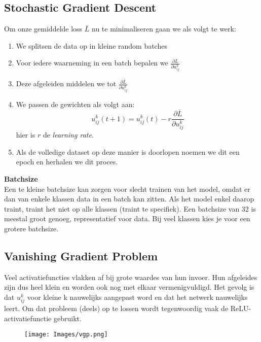 {\subsection{Stochastic Gradient Descent}
\noindent Om onze gemiddelde loss $\bar{L}$ nu te minimaliseren gaan we als volgt te werk:
\begin{enumerate}
    \item We splitsen de data op in kleine random batches
    \item Voor iedere waarneming in een batch bepalen we $\frac{\partial L}{\partial u_{ij}^k}$
    \item Deze afgeleiden middelen we tot $\frac{\partial \bar{L}}{\partial u_{ij}^k}$
    \item We passen de gewichten als volgt aan:
    \[u_{ij}^k(t+1)=u_{ij}^k(t)-r\frac{\partial \bar{L}}{\partial u_{ij}^k}\]
    hier is $r$ de \textit{learning rate}.
    \item Als de volledige dataset op deze manier is doorlopen noemen we dit een epoch en herhalen we dit proces.
\end{enumerate}

\textbf{Batchsize}\\
Een te kleine batchsize kan zorgen voor slecht trainen van het model, omdat er dan van enkele klassen data in een batch kan zitten. Als het model enkel daarop traint, traint het niet op alle klassen (traint te specifiek). Een batchsize van 32 is meestal groot genoeg, representatief voor data. Bij veel klassen kies je voor een grotere batchsize. 

\subsection{Vanishing Gradient Problem}
\noindent Veel activatiefuncties vlakken af bij grote waardes van hun invoer. Hun afgeleides zijn dus heel klein en worden ook nog met elkaar vermenigvuldigd. Het gevolg is dat $u_{ij}^k$ voor kleine k nauwelijks aangepast word en dat het netwerk nauwelijks leert. Om dat probleem (deels) op te lossen wordt tegenwoordig vaak de ReLU-activatiefunctie gebruikt.
\begin{figure}[h]
    \centering
    \texttt{[image: Images/vgp.png]}
    \caption*{}
    \label{fig:layer}
\end{figure}

\newpage
}
